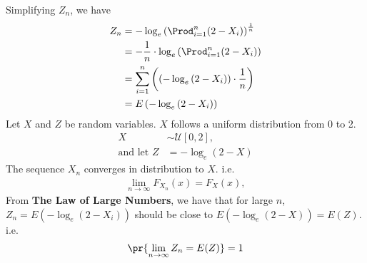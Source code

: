 

Simplifying $Z_n$, we have
\begin{align}
    Z_n &= -\log_e \left( \Prod_{i=1}^n (2-X_i) \right)^\frac{1}{n}\\
        &= -\frac{1}{n}\cdot \log_e \left( \Prod_{i=1}^n (2-X_i) \right)\\
        &= \sum\limits_{i=1}^n \left( (-\log_e \left( 2-X_i )\right)\cdot\frac{1}{n} \right)\\
        &= E\left(-\log_e \left( 2-X_i \right)\right)
\end{align}
Let $X$ and $Z$ be random variables. $X$ follows a uniform distribution from 0 to 2.
\begin{align}
    X &\sim \mathcal{U}[0,2],\\
    \text{and let }    Z&=-\log_e (2-X)
\end{align}
The sequence $X_n$ converges in distribution to $X$. i.e.
\begin{align}
    \lim _{n\to \infty }F_{X_n}(x)=F_X(x),
\end{align}
From \textbf{The Law of Large Numbers}, we have that %
 for large $n$, $Z_n=E\left(-\log_e \left( 2-X_i \right)\right)$ should be close to $E\left(-\log_e \left( 2-X \right)\right)=E(Z)$. i.e.
\begin{align}
    \pr{\lim\limits_{n \to \infty}Z_n=E(Z)}=1
    \label{st2021-19:Zn_and_Z}
\end{align}

